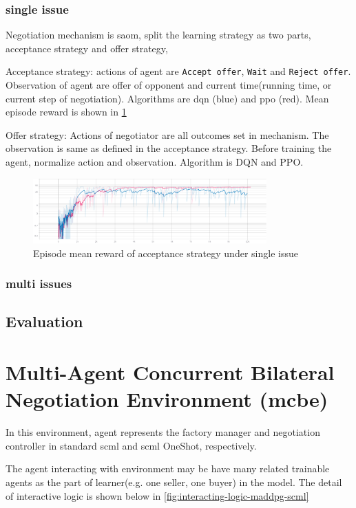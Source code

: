 \subsubsection{single issue}
Negotiation mechanism is \gls{saom}, split the learning strategy as two parts, acceptance strategy and offer strategy, 

Acceptance strategy: actions of agent are \texttt{Accept offer}, \texttt{Wait} and \texttt{Reject offer}. Observation of agent are offer of opponent and current time(running time, or current step of negotiation). Algorithms are \gls{dqn} (blue) and \gls{ppo} (red). Mean episode reward is shown in \ref{fig:acceptance-single-issue}

Offer strategy: Actions of negotiator are all outcomes set in mechanism. The observation is same as defined in the acceptance strategy. Before training the agent, normalize action and observation. Algorithm is DQN and PPO.

\begin{figure}[htbp]
\centering
\includegraphics[width=0.80\textwidth]{./images/ac_s_dqn_ppo1_log_EpRe.png}
\caption{Episode mean reward of acceptance strategy under single issue}
\label{fig:acceptance-single-issue}
\end{figure}

\subsubsection{multi issues}

\subsection{Evaluation}

\section{Multi-Agent Concurrent Bilateral Negotiation Environment (\gls{mcbe})}
In this environment, agent represents the factory manager and negotiation controller in standard \gls{scml} and \gls{scml} OneShot, respectively.

The agent interacting with environment may be have many related trainable agents as the part of learner(e.g. one seller, one buyer) in the model. The detail of interactive logic is shown below in \ref{fig:interacting-logic-maddpg-scml}


